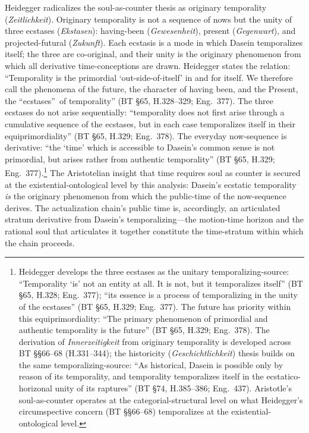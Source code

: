 Heidegger radicalizes the soul-as-counter thesis as originary temporality (\textit{Zeitlichkeit}). Originary temporality is not a sequence of nows but the unity of three ecstases (\textit{Ekstasen}): having-been (\textit{Gewesenheit}), present (\textit{Gegenwart}), and projected-futural (\textit{Zukunft}). Each ecstasis is a mode in which Dasein temporalizes itself; the three are co-original, and their unity is the originary phenomenon from which all derivative time-conceptions are drawn. Heidegger states the relation: ``Temporality is the primordial `out-side-of-itself' in and for itself. We therefore call the phenomena of the future, the character of having been, and the Present, the \textquotedblleft ecstases\textquotedblright\ of temporality'' (BT \S 65, H.328--329; Eng.~377). The three ecstases do not arise sequentially: ``temporality does not first arise through a cumulative sequence of the ecstases, but in each case temporalizes itself in their equiprimordiality'' (BT \S 65, H.329; Eng.~378). The everyday now-sequence is derivative: ``the `time' which is accessible to Dasein's common sense is not primordial, but arises rather from authentic temporality'' (BT \S 65, H.329; Eng.~377).\footnote{Heidegger develops the three ecstases as the unitary temporalizing-source: ``Temporality `is' not an entity at all. It is not, but it temporalizes itself'' (BT §65, H.328; Eng.~377); ``its essence is a process of temporalizing in the unity of the ecstases'' (BT §65, H.329; Eng.~377). The future has priority within this equiprimordiality: ``The primary phenomenon of primordial and authentic temporality is the future'' (BT §65, H.329; Eng.~378). The derivation of \textit{Innerzeitigkeit} from originary temporality is developed across BT §§66--68 (H.331--344); the historicity (\textit{Geschichtlichkeit}) thesis builds on the same temporalizing-source: ``As historical, Dasein is possible only by reason of its temporality, and temporality temporalizes itself in the ecstatico-horizonal unity of its raptures'' (BT §74, H.385--386; Eng.~437). Aristotle's soul-as-counter operates at the categorial-structural level on what Heidegger's circumspective concern (BT §§66--68) temporalizes at the existential-ontological level.} The Aristotelian insight that time requires soul as counter is secured at the existential-ontological level by this analysis: Dasein's ecstatic temporality \textit{is} the originary phenomenon from which the public-time of the now-sequence derives. The actualization chain's public time is, accordingly, an articulated stratum derivative from Dasein's temporalizing---the motion-time horizon and the rational soul that articulates it together constitute the time-stratum within which the chain proceeds.

